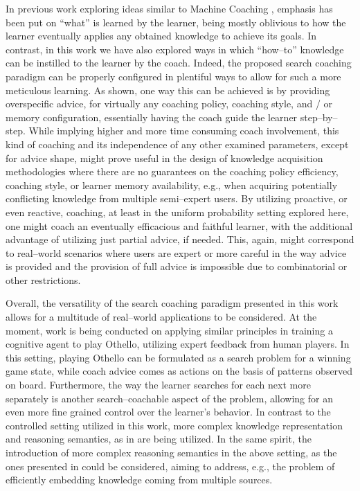 \documentclass[a4paper,twoside]{article}
\begin{document}
In previous work exploring ideas similar to Machine Coaching \cite{ioannouKnowledgeBasedTranslationNatural2021,proxyCoaching2022}, emphasis has been put on ``what'' is learned by the learner, being mostly oblivious to how the learner eventually applies any obtained knowledge to achieve its goals. In contrast, in this work we have also explored ways in which ``how--to'' knowledge can be instilled to the learner by the coach. Indeed, the proposed search coaching paradigm can be properly configured in plentiful ways to allow for such a more meticulous learning. As shown, one way this can be achieved is by providing overspecific advice, for virtually any coaching policy, coaching style, and / or memory configuration, essentially having the coach guide the learner step--by--step. While implying higher and more time consuming coach involvement, this kind of coaching and its independence of any other examined parameters, except for advice shape, might prove useful in the design of knowledge acquisition methodologies where there are no guarantees on the coaching policy efficiency, coaching style, or learner memory availability, e.g., when acquiring potentially conflicting knowledge from multiple semi--expert users. By utilizing proactive, or even reactive, coaching, at least in the uniform probability setting explored here, one might coach an eventually efficacious and faithful learner, with the additional advantage of utilizing just partial advice, if needed. This, again, might correspond to real--world scenarios where users are expert or more careful in the way advice is provided and the provision of full advice is impossible due to combinatorial or other restrictions.

Overall, the versatility of the search coaching paradigm presented in this work allows for a multitude of real--world applications to be considered. At the moment, work is being conducted on applying similar principles in training a cognitive agent to play Othello, utilizing expert feedback from human players. In this setting, playing Othello can be formulated as a search problem for a winning game state, while coach advice comes as actions on the basis of patterns observed on board. Furthermore, the way the learner searches for each next more separately is another search--coachable aspect of the problem, allowing for an even more fine grained control over the learner's behavior. In contrast to the controlled setting utilized in this work, more complex knowledge representation and reasoning semantics, as in \cite{michaelMachineCoaching2019,prudens2022} are being utilized. In the same spirit, the introduction of more complex reasoning semantics in the above setting, as the ones presented in \cite{DUNG1995321} could be considered, aiming to address, e.g., the problem of efficiently embedding knowledge coming from multiple sources.
\end{document}

